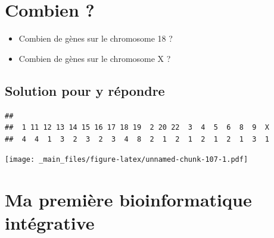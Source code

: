 \documentclass[
]{book}
\newenvironment{Shaded}{\begin{snugshade}}{\end{snugshade}}
\newcommand{\AttributeTok}[1]{\textcolor[rgb]{0.77,0.63,0.00}{#1}}
\newcommand{\ConstantTok}[1]{\textcolor[rgb]{0.00,0.00,0.00}{#1}}
\newcommand{\DecValTok}[1]{\textcolor[rgb]{0.00,0.00,0.81}{#1}}
\newcommand{\FunctionTok}[1]{\textcolor[rgb]{0.00,0.00,0.00}{#1}}
\newcommand{\NormalTok}[1]{#1}
\newcommand{\SpecialCharTok}[1]{\textcolor[rgb]{0.00,0.00,0.00}{#1}}
\newcommand{\StringTok}[1]{\textcolor[rgb]{0.31,0.60,0.02}{#1}}
\providecommand{\tightlist}{%
  \setlength{\itemsep}{0pt}\setlength{\parskip}{0pt}}
\begin{document}
\hypertarget{combien}{%
\section{Combien ?}\label{combien}}

\begin{itemize}
\tightlist
\item
  Combien de gènes sur le chromosome 18 ?
\item
  Combien de gènes sur le chromosome X ?
\end{itemize}

\hypertarget{solution-pour-y-ruxe9pondre}{%
\subsection{Solution pour y répondre}\label{solution-pour-y-ruxe9pondre}}

\begin{Shaded}
\end{Shaded}

\begin{verbatim}
## 
##  1 11 12 13 14 15 16 17 18 19  2 20 22  3  4  5  6  8  9  X 
##  4  4  1  3  2  3  2  3  4  8  2  1  2  1  2  1  2  1  3  1
\end{verbatim}

\begin{Shaded}
\end{Shaded}

\texttt{[image: \_main\_files/figure-latex/unnamed-chunk-107-1.pdf]}

\hypertarget{ma-premiuxe8re-bioinformatique-intuxe9grative}{%
\section{Ma première bioinformatique intégrative}\label{ma-premiuxe8re-bioinformatique-intuxe9grative}}
\end{document}

